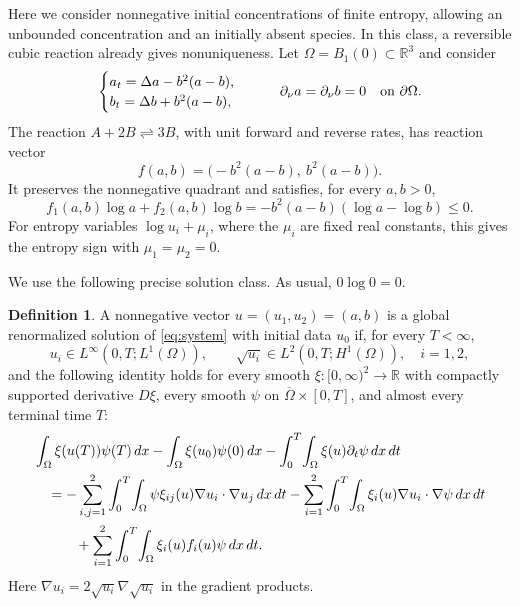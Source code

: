 \documentclass[11pt]{article}
\theoremstyle{definition}
\newtheorem{definition}[theorem]{Definition}
\newcommand{\Om}{\Omega}
\newcommand{\R}{\mathbb R}
\newcommand{\dd}{\,dx}
\newcommand{\dt}{\,dt}
\begin{document}
Here we consider nonnegative initial concentrations of finite entropy,
allowing an unbounded concentration and an initially absent species. In this
class, a reversible cubic reaction already gives nonuniqueness. Let
$\Om=B_1(0)\subset\R^3$ and consider
\begin{equation}\label{eq:system}
 \begin{cases}
 a_t=\Delta a-b^2(a-b),\\
 b_t=\Delta b+b^2(a-b),
 \end{cases}
 \qquad \partial_\nu a=\partial_\nu b=0\quad\hbox{on }\partial\Om.
\end{equation}
The reaction $A+2B\rightleftharpoons3B$, with unit forward and reverse
rates, has reaction vector
\begin{equation}\label{eq:reaction}
 f(a,b)=\bigl(-b^2(a-b),\ b^2(a-b)\bigr).
\end{equation}
It preserves the nonnegative quadrant and satisfies, for every $a,b>0$,
\begin{equation}\label{eq:entropy-sign}
 f_1(a,b)\log a+f_2(a,b)\log b
   =-b^2(a-b)(\log a-\log b)\le0.
\end{equation}
For entropy variables $\log u_i+\mu_i$, where the $\mu_i$ are fixed real
constants, this gives the entropy sign with $\mu_1=\mu_2=0$.

We use the following precise solution class. As usual, $0\log0=0$.
\begin{definition}\label{def:renormalized}
A nonnegative vector $u=(u_1,u_2)=(a,b)$ is a global renormalized solution
of \eqref{eq:system} with initial data $u_0$ if, for every $T<\infty$,
\begin{equation}\label{eq:class}
 u_i\in L^\infty(0,T;L^1(\Om)),\qquad
 \sqrt{u_i}\in L^2(0,T;H^1(\Om)),\quad i=1,2,
\end{equation}
and the following identity holds for every smooth
$\xi:[0,\infty)^2\to\R$ with compactly supported derivative $D\xi$, every
smooth $\psi$ on $\overline\Om\times[0,T]$, and almost every terminal time $T$:
\begin{align}\label{eq:renormalized}
 &\int_\Om\xi(u(T))\psi(T)\dd-\int_\Om\xi(u_0)\psi(0)\dd
       -\int_0^T\!\int_\Om\xi(u)\partial_t\psi\dd\dt\notag\\
 &\quad=-\sum_{i,j=1}^2\int_0^T\!\int_\Om
             \psi\xi_{ij}(u)\nabla u_i\cdot\nabla u_j\dd\dt
       -\sum_{i=1}^2\int_0^T\!\int_\Om
             \xi_i(u)\nabla u_i\cdot\nabla\psi\dd\dt\notag\\
 &\qquad\quad+\sum_{i=1}^2\int_0^T\!\int_\Om
             \xi_i(u)f_i(u)\psi\dd\dt.
\end{align}
Here $\nabla u_i=2\sqrt{u_i}\nabla\sqrt{u_i}$ in the gradient products.
\end{definition}
\end{document}
